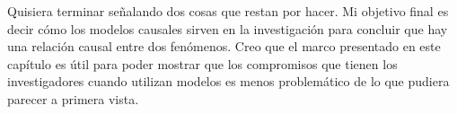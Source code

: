 \documentclass{article}
\begin{document}
Quisiera terminar señalando dos cosas que restan por hacer. Mi objetivo final es decir cómo los modelos causales sirven en la investigación para concluir que hay una relación causal entre dos fenómenos. Creo que el marco presentado en este capítulo es útil para poder mostrar que los compromisos que tienen los investigadores cuando utilizan modelos es menos problemático de lo que pudiera parecer a primera vista.



\end{document}
